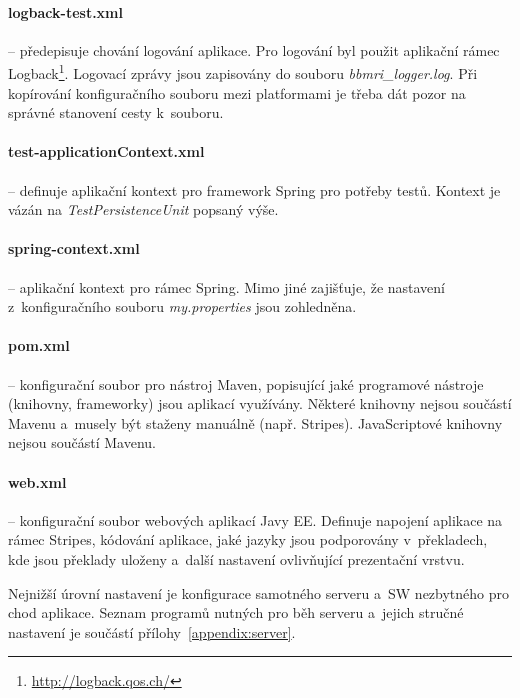 \documentclass[11pt, draft, oneside]{fithesis2}
\begin{document}
\paragraph*{logback-test.xml} -- předepisuje chování logování aplikace. Pro logování byl použit aplikační rámec Logback\footnote{\url{http://logback.qos.ch/}}. Logovací zprávy jsou zapisovány do souboru \textit{bbmri\_logger.log}. Při kopírování konfiguračního souboru mezi platformami je třeba dát pozor na správné stanovení cesty k~souboru.

\paragraph*{test-applicationContext.xml} -- definuje aplikační kontext pro framework Spring pro potřeby testů. Kontext je vázán na \textit{TestPersistenceUnit} popsaný výše.

\paragraph*{spring-context.xml} -- aplikační kontext pro rámec Spring. Mimo jiné zajišťuje, že nastavení z~konfiguračního souboru \textit{my.properties} jsou zohledněna.

\paragraph*{pom.xml} -- konfigurační soubor pro nástroj Maven, popisující jaké programové nástroje (knihovny, frameworky) jsou aplikací využívány. Některé knihovny nejsou součástí Mavenu a~musely být staženy manuálně (např. Stripes). JavaScriptové knihovny nejsou součástí Mavenu.

\paragraph*{web.xml} -- konfigurační soubor webových aplikací Javy EE. Definuje napojení aplikace na rámec Stripes, kódování aplikace, jaké jazyky jsou podporovány v~překladech, kde jsou překlady uloženy a~další nastavení ovlivňující prezentační vrstvu.

Nejnižší úrovní nastavení je konfigurace samotného serveru a~SW nezbytného pro chod aplikace. Seznam programů nutných pro běh serveru a~jejich stručné nastavení je součástí přílohy~\ref{appendix:server}.

\end{document}
